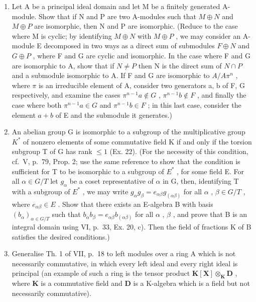 \begin{enumerate}
\def\labelenumi{\arabic{enumi})}
\setcounter{enumi}{22}
\item
  Let A be a principal ideal domain and let M be a finitely generated A-module. Show that if N and P are two A-modules such that \(M \oplus N\) and \(M \oplus P\) are isomorphic, then N and P are isomorphic. (Reduce to the case where M is cyclic; by identifying \(M \oplus N\) with \(M \oplus P\) , we may consider an A-module E decomposed in two ways as a direct sum of submodules \(F \oplus N\) and \(G \oplus P\) , where F and G are cyclic and isomorphic. In the case where F and G are isomorphic to A, show that if \(N \neq P\) then N is the direct sum of \(N \cap P\) and a submodule isomorphic to A. If F and G are isomorphic to \(A/A\pi^{n}\) , where \(\pi\) is an irreducible element of A, consider two generators a, b of F, G respectively, and examine the cases \(\pi^{n-1}a \notin G\) , \(\pi^{n-1}b \notin F\) , and finally the case where both \(\pi^{n-1}a \in G\) and \(\pi^{n-1}b \in F\) ; in this last case, consider the element \(a + b\) of E and the submodule it generates.)
\item
  An abelian group G is isomorphic to a subgroup of the multiplicative group \(K^{*}\) of nonzero elements of some commutative field K if and only if the torsion subgroup T of G has rank \(\leqslant 1\) (Ex. 22). (For the necessity of this condition, cf.~V, p.~79, Prop. 2; use the same reference to show that the condition is sufficient for T to be isomorphic to a subgroup of \(E^{*}\) , for some field E. For all \(\alpha \in G/T\) let \(g_{\alpha}\) be a coset representative of \(\alpha\) in G, then, identifying T with a subgroup of \(E^{*}\) , we may write \(g_{\alpha}g_{\beta} = e_{\alpha\beta}g_{(\alpha\beta)}\) for all \(\alpha\) , \(\beta \in G/T\) , where \(e_{\alpha\beta} \in E\) . Show that there exists an E-algebra B with basis \((b_{\alpha})_{\alpha \in G/T}\) such that \(b_{\alpha}b_{\beta} = e_{\alpha\beta}b_{(\alpha\beta)}\) for all \(\alpha\) , \(\beta\) , and prove that B is an integral domain using VI, p.~33, Ex. 20, c). Then the field of fractions K of B satisfies the desired conditions.)
\item
  Generalise Th. 1 of VII, p.~18 to left modules over a ring A which is not necessarily commutative, in which every left ideal and every right ideal is principal (an example of such a ring is the tensor product \(\mathbf{K}[\mathbf{X}] \otimes_{\mathbf{K}} \mathbf{D}\) , where \(\mathbf{K}\) is a commutative field and \(\mathbf{D}\) is a K-algebra which is a field but not necessarily commutative).
\end{enumerate}

